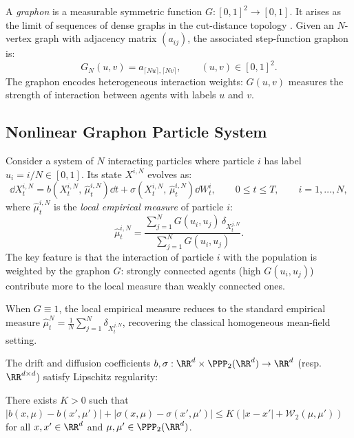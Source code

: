\documentclass[11pt]{article}
\begin{document}
A \emph{graphon} is a measurable symmetric function $G : [0,1]^2 \to [0,1]$. It arises as the limit of sequences of dense graphs in the cut-distance topology \citep{lovasz2012large}. Given an $N$-vertex graph with adjacency matrix $(a_{ij})$, the associated step-function graphon is:
\begin{equation}
  G_N(u,v) = a_{\lceil Nu \rceil, \lceil Nv \rceil}, \qquad (u,v) \in [0,1]^2.
\end{equation}
The graphon encodes heterogeneous interaction weights: $G(u,v)$ measures the strength of interaction between agents with labels $u$ and $v$.

\subsection{Nonlinear Graphon Particle System}

Consider a system of $N$ interacting particles where particle $i$ has label $u_i = i/N \in [0,1]$. Its state $X^{i,N}$ evolves as:
\begin{equation}\label{eq:graphon-particle}
  \dd X_t^{i,N} = b\!\left(X_t^{i,N}, \, \hat{\mu}_t^{i,N}\right)\dd t + \sigma\!\left(X_t^{i,N}, \, \hat{\mu}_t^{i,N}\right)\dd W_t^i, \qquad 0 \leq t \leq T, \qquad i = 1, \ldots, N,
\end{equation}
where $\hat{\mu}_t^{i,N}$ is the \emph{local empirical measure} of particle $i$:
\begin{equation}\label{eq:local-empirical}
  \hat{\mu}_t^{i,N} = \frac{\sum_{j=1}^N G(u_i, u_j)\,\delta_{X_t^{j,N}}}{\sum_{j=1}^N G(u_i, u_j)}.
\end{equation}
The key feature is that the interaction of particle $i$ with the population is weighted by the graphon $G$: strongly connected agents (high $G(u_i, u_j)$) contribute more to the local measure than weakly connected ones.

\begin{remark}
  When $G \equiv 1$, the local empirical measure reduces to the standard empirical measure $\hat{\mu}_t^N = \frac{1}{N}\sum_{j=1}^N \delta_{X_t^{j,N}}$, recovering the classical homogeneous mean-field setting.
\end{remark}

The drift and diffusion coefficients $b, \sigma : \RR^d \times \PPP_2(\RR^d) \to \RR^d$ (resp.\ $\RR^{d \times d}$) satisfy Lipschitz regularity:
\begin{assumption}\label{ass:lipschitz}
  There exists $K > 0$ such that $|b(x,\mu) - b(x',\mu')| + |\sigma(x,\mu) - \sigma(x',\mu')| \le K(|x-x'| + \mathcal{W}_2(\mu,\mu'))$ for all $x, x' \in \RR^d$ and $\mu, \mu' \in \PPP_2(\RR^d)$.
\end{assumption}
\end{document}
